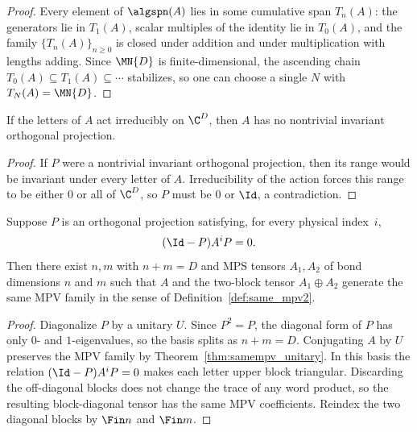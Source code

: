 \begin{proof}
    \leanok
    Every element of $\algspn(A)$ lies in some cumulative span $T_n(A)$:
    the generators lie in $T_1(A)$, scalar multiples of the identity lie in
    $T_0(A)$, and the family $\{T_n(A)\}_{n \ge 0}$ is closed under addition
    and under multiplication with lengths adding.
    Since $\MN{D}$ is finite-dimensional, the ascending chain
    $T_0(A) \subseteq T_1(A) \subseteq \cdots$ stabilizes, so one can choose a
    single $N$ with $T_N(A) = \MN{D}$.
\end{proof}

\begin{lemma}\label{lem:irreducible_action_to_tensor}
    \leanok
    If the letters of $A$ act irreducibly on $\C^D$, then $A$ has no nontrivial
    invariant orthogonal projection.
\end{lemma}

\begin{proof}
    \leanok
    If $P$ were a nontrivial invariant orthogonal projection, then its range
    would be invariant under every letter of $A$.
    Irreducibility of the action forces this range to be either $0$ or all of
    $\C^D$, so $P$ must be $0$ or $\Id$, a contradiction.
\end{proof}

\begin{theorem}\label{thm:lowerzero_two_block}
    \leanok
    Suppose $P$ is an orthogonal projection satisfying, for every physical
    index~$i$,
    \[
        (\Id - P) A^i P = 0.
    \]
    Then there exist $n,m$ with $n + m = D$ and MPS tensors $A_1, A_2$ of bond
    dimensions $n$ and $m$ such that $A$ and the two-block tensor
    $A_1 \oplus A_2$ generate the same MPV family in the sense of
    Definition~\ref{def:same_mpv2}.
\end{theorem}

\begin{proof}
    \leanok
    Diagonalize $P$ by a unitary $U$.
    Since $P^2 = P$, the diagonal form of $P$ has only $0$- and $1$-eigenvalues,
    so the basis splits as $n + m = D$.
    Conjugating $A$ by $U$ preserves the MPV family by
    Theorem~\ref{thm:samempv_unitary}.
    In this basis the relation $(\Id - P) A^i P = 0$ makes each letter upper
    block triangular.
    Discarding the off-diagonal blocks does not change the trace of any word
    product, so the resulting block-diagonal tensor has the same MPV coefficients.
    Reindex the two diagonal blocks by $\Fin n$ and $\Fin m$.
\end{proof}

